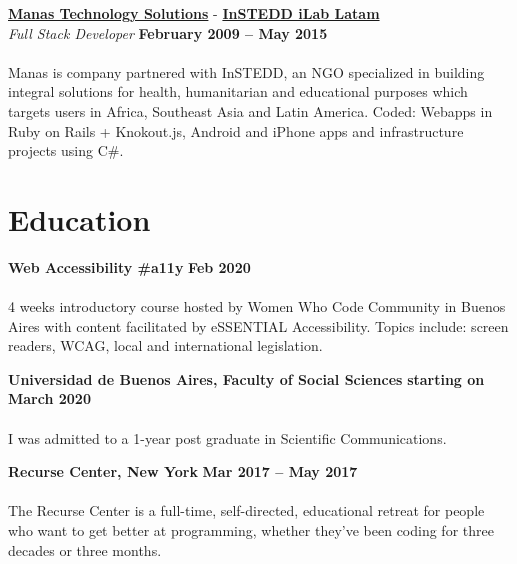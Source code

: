 \documentclass[margin,line]{resume}
\begin{document}
\begin{resume}
\textbf{\href{http://www.manas.com.ar/}{Manas Technology Solutions}} - 
\textbf{\href{http://www.instedd.org/}{InSTEDD iLab Latam}}\vspace{2mm}\\\vspace{1mm}
\textsl{Full Stack Developer} \hfill \textbf{February 2009 -- May 2015}\vspace{-3mm}\\\vspace{-1mm}
\\
Manas is company partnered with InSTEDD, an NGO specialized in building integral solutions for health, humanitarian and educational purposes which targets users in Africa, Southeast Asia and Latin America.  
Coded: Webapps in Ruby on Rails + Knokout.js, Android and iPhone  apps and infrastructure projects using C\#.



\section{\mysidestyle Education}

\textbf{Web Accessibility  \#a11y} \hfill \textbf{Feb 2020}\vspace{-3mm}\\\vspace{-1mm}
\\
4 weeks introductory course hosted by Women Who Code Community in Buenos Aires with content facilitated by eSSENTIAL Accessibility. Topics include: screen readers, WCAG, local and international legislation.  


\textbf{Universidad de Buenos Aires, Faculty of Social Sciences} \hfill \textbf{starting on March 2020}\vspace{-3mm}\\\vspace{-1mm}
\\
I was admitted to a 1-year post graduate in Scientific Communications.


\textbf{Recurse Center, New York} \hfill \textbf{Mar 2017 -- May 2017}\vspace{-3mm}\\\vspace{-1mm}
\\
The Recurse Center is a full-time, self-directed, educational retreat for people who want to get better at programming, whether they've been coding for three decades or three months.  \\



\end{resume}
\end{document}

